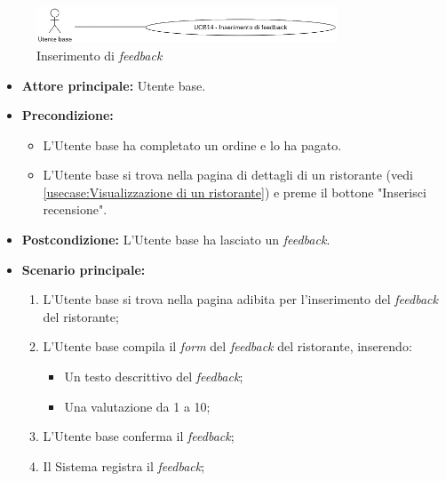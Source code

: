 \newpage
{}
\label{usecase:Inserimento di feedback}

\begin{figure}[h]
	\centering
	\includegraphics[width=0.8\textwidth]{./uml/UCB14.png} 
	\caption{Inserimento di \textit{feedback}}
	\label{fig:UCB16}
  \end{figure}

\begin{itemize}
	\item \textbf{Attore principale:} Utente base.

	\item \textbf{Precondizione:} 
	\begin{itemize}
		\item L'Utente base ha completato un ordine e lo ha pagato.
		\item L'Utente base si trova nella pagina di dettagli di un ristorante (vedi
		\autoref{usecase:Visualizzazione di un ristorante}) e preme il bottone "Inserisci recensione".
	\end{itemize}

	\item \textbf{Postcondizione:} L'Utente base ha lasciato un \textit{feedback}.

	\item \textbf{Scenario principale:}
	      \begin{enumerate}
		      \item L'Utente base si trova nella pagina adibita per l'inserimento del \textit{feedback} del ristorante;

		      \item L'Utente base compila il \textit{form} del \textit{feedback} del ristorante, inserendo: 
		            \begin{itemize}
			            \item Un testo descrittivo del \textit{feedback};
			            \item Una valutazione da 1 a 10;
		            \end{itemize}

		      \item L'Utente base conferma il \textit{feedback};

		      \item Il Sistema registra il \textit{feedback};

	      \end{enumerate}
\end{itemize}
